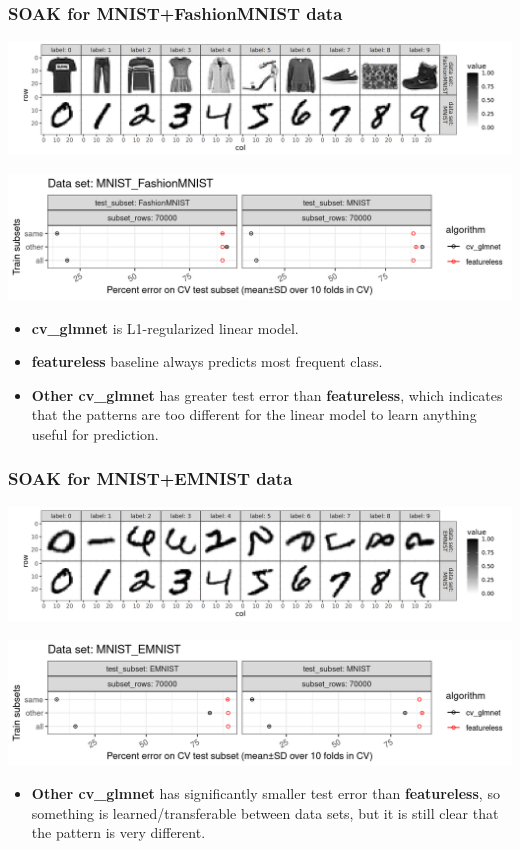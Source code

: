 \documentclass[t]{beamer}
\begin{document}
\begin{frame}
  \frametitle{SOAK for MNIST+FashionMNIST data}

  \includegraphics[width=\textwidth]{data_Classif_MNIST_other_FashionMNIST.png}
  
  \includegraphics[width=\textwidth]{MNIST_FashionMNIST_error_glmnet_featureless_mean_SD.png}
  \begin{itemize}
  \item \textbf{cv\_glmnet} is L1-regularized linear model.
  \item \textbf{featureless} baseline always predicts most frequent class.
  \item \textbf{Other cv\_glmnet} has greater test error than
    \textbf{featureless}, which indicates that the patterns are too
    different for the linear model to learn anything useful for prediction. 
  \end{itemize}
\end{frame}

\begin{frame}
  \frametitle{SOAK for MNIST+EMNIST data}

  \includegraphics[width=\textwidth]{data_Classif_MNIST_other_EMNIST.png}
  
  \includegraphics[width=\textwidth]{MNIST_EMNIST_error_glmnet_featureless_mean_SD.png}
  \begin{itemize}
  \item \textbf{Other cv\_glmnet} has significantly smaller test error
    than \textbf{featureless}, so something is learned/transferable between
    data sets, but it is still clear that the pattern is very
    different.
  \end{itemize}
\end{frame}
\end{document}
